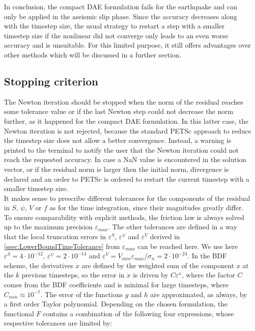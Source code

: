 In conclusion, the compact DAE formulation fails for the earthquake and can only be applied in the aseismic slip phase. Since the accuracy decreases along with the timestep size, the usual strategy to restart a step with a smaller timestep size if the nonlinear did not converge only leads to an even worse accuracy and is unsuitable. For this limited purpose, it still offers advantages over other methods which will be discussed in a further section.

\subsection{Stopping criterion}
\label{ssec:StoppingCriterionNewton}
The Newton iteration should be stopped when the norm of the residual reaches some tolerance value or if the last Newton step could not decrease the norm further, as it happened for the compact DAE formulation. In this latter case, the Newton iteration is not rejected, because the standard PETSc approach to reduce the timestep size does not allow a better convergence. Instead, a warning is printed to the terminal to notify the user that the Newton iteration could not reach the requested accuracy. In case a NaN value is encountered in the solution vector, or if the residual norm is larger then the initial norm, divergence is declared and an order to PETSc is ordered to restart the current timestep with a smaller timestep size. \\
It makes sense to prescribe different tolerances for the components of the residual in $S$, $\psi$, $V$ or $f$ as for the time integration, since their magnitudes greatly differ. To ensure comparability with explicit methods, the friction law is always solved up to the maximum precision $\varepsilon_{max}$. The other tolerances are defined in a way that the local truncation errors in $\varepsilon^S$, $\varepsilon^\psi$ and $\varepsilon^V$ derived in \autoref{ssec:LowerBoundTimeTolerance} from $\varepsilon_{max}$ can be reached here. We use here $\varepsilon^S=4\cdot10^{-12}$, $\varepsilon^\psi=2\cdot10^{-14}$ and $\varepsilon^V=V_{min}\varepsilon_{max}/\sigma_n=2\cdot10^{-24}$. In the BDF scheme, the derivatives $\dot{x}$ are defined by the weighted sum of the component $x$ at the $k$ previous timesteps, so the error in $\dot{x}$ is driven by $C\varepsilon^x$, where the factor $C$ comes from the BDF coefficients and is minimal for large timesteps, where $C_{min}\approx10^{-7}$. The error of the functions $g$ and $h$ are approximated, as always, by a first order Taylor polynomial. Depending on the chosen formulation, the functional $F$ contains a combination of the following four expressions, whose respective tolerances are limited by: 
